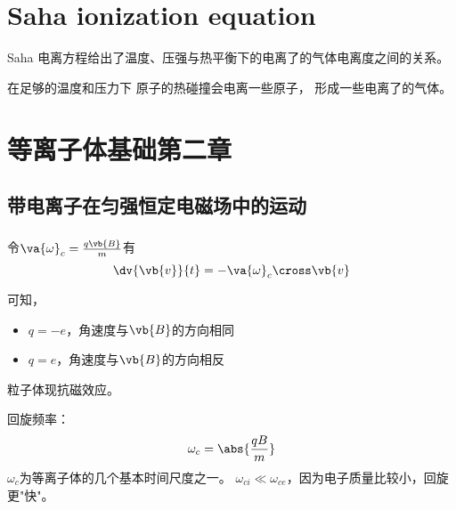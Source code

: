 
\section{Saha ionization equation}
Saha 电离方程给出了温度、压强与热平衡下的电离了的气体电离度之间的关系。

在足够的温度和压力下
原子的热碰撞会电离一些原子，
形成一些电离了的气体。

% 

\section{等离子体基础第二章}

\subsection{带电离子在匀强恒定电磁场中的运动}
\subsubsection{}
令\(\va{\omega}_c = \frac{q \vb{B}}{m} \)有
\begin{equation}
  \dv{\vb{v}}{t} = - \va{\omega}_c \cross \vb{v}
\end{equation}

可知，
\begin{itemize}
  \item \(q=-e\)，角速度与\(\vb{B}\)的方向相同
  \item \(q=e\)，角速度与\(\vb{B}\)的方向相反
\end{itemize}
粒子体现抗磁效应。

回旋频率：
\begin{equation}
  \omega_c = \abs{\frac{qB}{m}}
\end{equation}
\(\omega_c\)为等离子体的几个基本时间尺度之一。
\(\omega_{ci} \ll  \omega_{ce}\)，因为电子质量比较小，回旋更"快"。




